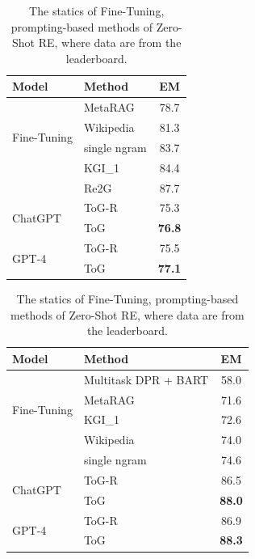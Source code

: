 \documentclass{article} %
\begin{document}
\begin{table}[htbp]
\centering
\begin{minipage}{0.45\textwidth}
\centering
\begin{tabular}{llc}
\hline
\textbf{Model} & \textbf{Method} & \textbf{EM} \\ \hline
\multirow{4}{*}{Fine-Tuning} & MetaRAG & 78.7 \\
& Wikipedia & 81.3 \\
& single ngram & 83.7 \\
& KGI\_1 & 84.4 \\
& Re2G \citep{trex1} & 87.7 \\
\hline
\multirow{2}{*}{ChatGPT} & ToG-R & 75.3 \\
& ToG & \textbf{76.8} \\ \hline
\multirow{2}{*}{GPT-4} & ToG-R & 75.5 \\
& ToG & \textbf{77.1} \\ \hline
\end{tabular}
\caption{The statics of Fine-Tuning, prompting-based methods of T-REx dataset, where data are from the leaderboard.}
\label{tab: trex}
\end{minipage}
\hfill
\begin{minipage}{0.45\textwidth}
\centering
\begin{tabular}{llc}
\hline
\textbf{Model} & \textbf{Method} & \textbf{EM} \\ \hline
\multirow{4}{*}{Fine-Tuning} & Multitask DPR + BART & 58.0 \\
& MetaRAG & 71.6 \\
& KGI\_1 & 72.6 \\
& Wikipedia & 74.0 \\
& single ngram  & 74.6 \\
\hline
\multirow{2}{*}{ChatGPT} & ToG-R & 86.5 \\
& ToG & \textbf{88.0} \\ \hline
\multirow{2}{*}{GPT-4} & ToG-R & 86.9 \\
& ToG & \textbf{88.3} \\ \hline
\end{tabular}
\caption{The statics of Fine-Tuning, prompting-based methods of Zero-Shot RE, where data are from the leaderboard.}
\label{tab: zeroshotre}
\end{minipage}
\end{table}
\end{document}

